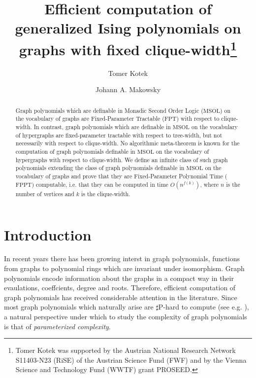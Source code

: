 \documentclass{llncs}
\newcommand{\MSOL}{\mathrm{MSOL}}
\newcommand{\FPT}{\mathrm{FPT}}
\newcommand{\FPPT}{\mathrm{FPPT}}
\newcommand{\sharpP}{\mathrm{\sharp P}}
\begin{document}
\title{Efficient computation of generalized Ising polynomials on graphs
with fixed clique-width\thanks{Tomer Kotek was supported by the Austrian
National Research Network S11403-N23 (RiSE) of the Austrian Science
Fund (FWF) and by the Vienna Science and Technology Fund (WWTF)
grant PROSEED. }}
\author{Tomer Kotek \and Johann A. Makowsky}

\maketitle
\begin{abstract}
Graph polynomials which are definable in 
Monadic Second
Order Logic ($\MSOL$) on the vocabulary
of graphs are Fixed-Parameter Tractable ($\FPT$) with respect to clique-width.
In contrast, graph polynomials which are definable in $\MSOL$ on the vocabulary of hypergraphs are 
fixed-parameter tractable
with respect to tree-width, but not necessarily
with respect to clique-width. No algorithmic meta-theorem is known
for the computation of graph polynomials definable in $\MSOL$ on
the vocabulary of hypergraphs with respect to clique-width. We define an infinite class of such graph
polynomials extending the class of graph polynomials definable in
$\MSOL$ on the vocabulary of graphs and prove that they are Fixed-Parameter 
Polynomial Time ($\FPPT$) computable, i.e. that they can be computed
in time $O(n^{f(k)})$, where $n$ is the number of vertices and $k$
is the clique-width. 
\end{abstract}

\section{Introduction}

In recent years there has been growing interst in graph polynomials,
functions from graphs to polynomial rings which are invariant under
isomorphism. Graph polynomials encode information about the graphs
in a compact way in their evaulations, coeffcients, degree and roots.
Therefore, efficient computation of graph polynomials has received
considerable attention in the literature. Since most graph polynomials
which naturally arise are $\sharpP$-hard to compute (see e.g. \cite{valiant1979complexity,ar:JVW90,pr:BH08}),
a natural perspective under which to study the complexity of graph polynomials
is that of {\em parameterized complexity}. 
\end{document}
